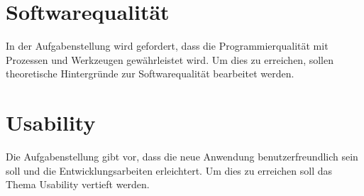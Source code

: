\section{Softwarequalität}
In der Aufgabenstellung wird gefordert, dass die Programmierqualität mit Prozessen und Werkzeugen gewährleistet wird.
Um dies zu erreichen, sollen theoretische Hintergründe zur Softwarequalität bearbeitet werden. 

\section{Usability}
Die Aufgabenstellung gibt vor, dass die neue Anwendung benutzerfreundlich sein soll und die Entwicklungsarbeiten erleichtert.
Um dies zu erreichen soll das Thema Usability vertieft werden.

